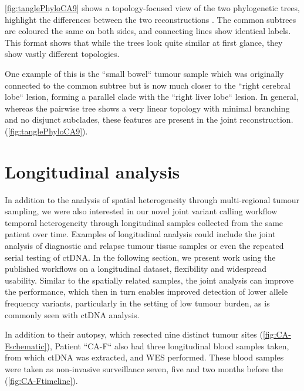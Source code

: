 \autoref{fig:tanglePhyloCA9} shows a topology-focused view of the two phylogenetic trees, highlight the differences between the two reconstructions \cite{Vienne2018}. The common subtrees are coloured the same on both sides, and connecting lines show identical labels. This format shows that while the trees look quite similar at first glance, they show vastly different topologies.


One example of this is the ``small bowel`` tumour sample which was originally connected to the common  subtree but is now much closer to the ``right cerebral lobe`` lesion, forming a parallel clade with the ``right liver lobe`` lesion. In general, whereas the pairwise tree shows a very linear topology with minimal branching and no disjunct subclades, these features are present in the joint reconstruction.  (\autoref{fig:tanglePhyloCA9}).


\section[Longitudinal analysis]{Longitudinal analysis}
\label{variantcalling-sec:longitudinal}

In addition to the analysis of spatial heterogeneity through multi-regional tu\-mour sam\-pling, we were also interested in  our novel joint variant calling workflow  temporal heterogeneity through longitudinal samples collected from the same patient over time. Examples of longitudinal analysis could include the joint analysis of diagnostic and relapse tumour tissue samples or even the repeated serial testing of ctDNA. In the following section, we present work using the published workflows on a longitudinal dataset,  flexibility and widespread usability. Similar to the spatially related samples, the joint analysis can improve the performance, which then in turn enables improved detection of lower allele frequency variants, particularly in the setting of low tumour burden, as is commonly seen with ctDNA analysis.

In addition to their autopsy, which resected nine distinct tumour sites (\autoref{fig:CA-Fschematic}), Patient ``CA-F`` also had three longitudinal blood samples taken, from which ctDNA was extracted, and WES performed. These blood samples were taken as non-invasive surveillance seven, five and two months before the  (\autoref{fig:CA-Ftimeline}).

